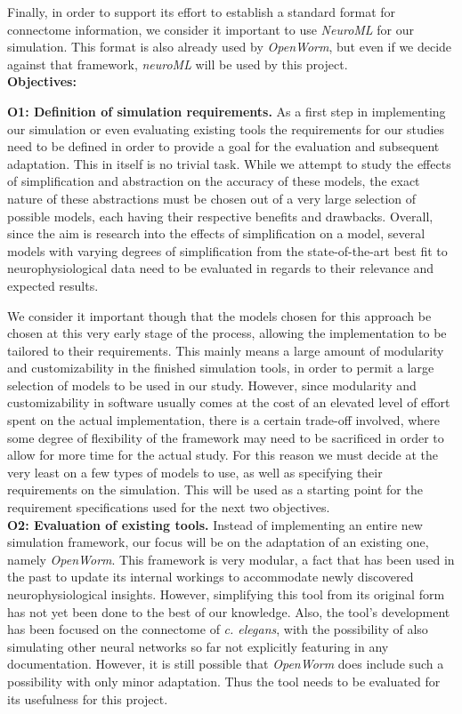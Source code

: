 \documentclass[a4paper,11pt]{article}
\begin{document}
Finally, in order to support its effort to establish a standard format for connectome information, we consider it important to use \emph{NeuroML} \citep{Gleeson2010} for our simulation. This format is also already used by \emph{OpenWorm}, but even if we decide against that framework, \emph{neuroML} will be used by this project.
\\[0,2cm]

\textbf{Objectives:}

\textbf{O1: Definition of simulation requirements.}
As a first step in implementing our simulation or even evaluating existing tools the requirements for our studies need to be defined in order to provide a goal for the evaluation and subsequent adaptation. This in itself is no trivial task. While we attempt to study the effects of simplification and abstraction on the accuracy of these models, the exact nature of these abstractions must be chosen out of a very large selection of possible models, each having their respective benefits and drawbacks. 
Overall, since the aim is research into the effects of simplification on a model, several models with varying degrees of simplification from the state-of-the-art best fit to neurophysiological data need to be evaluated in regards to their relevance and expected results.

We consider it important though that the models chosen for this approach be chosen at this very early stage of the process, allowing the implementation to be tailored to their requirements. This mainly means a large amount of modularity and customizability in the finished simulation tools, in order to permit a large selection of models to be used in our study. However, since modularity and customizability in software usually comes at the cost of an elevated level of effort spent on the actual implementation, there is a certain trade-off involved, where some degree of flexibility of the framework may need to be sacrificed in order to allow for more time for the actual study.
For this reason we must decide at the very least on a few types of models to use, as well as specifying their requirements on the simulation. This will be used as a starting point for the requirement specifications used for the next two objectives.
\\[0.2cm]

\textbf{O2: Evaluation of existing tools.} 
Instead of implementing an entire new simulation framework, our focus will be on the adaptation of an existing one, namely \emph{OpenWorm}. This framework is very modular, a fact that has been used in the past to update its internal workings to accommodate newly discovered neurophysiological insights. However, simplifying this tool from its original form has not yet been done to the best of our knowledge. Also, the tool's development has been focused on the connectome of \emph{c. elegans}, with the possibility of also simulating other neural networks so far not explicitly featuring in any documentation. However, it is still possible that \emph{OpenWorm} does include such a possibility with only minor adaptation. Thus the tool needs to be evaluated for its usefulness for this project.
\end{document}
